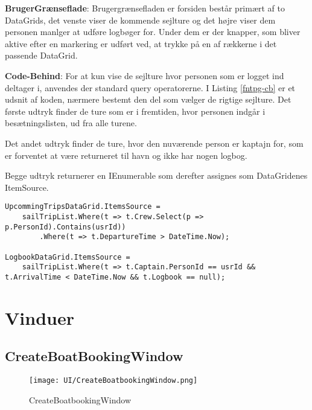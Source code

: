 \textbf{BrugerGrænseflade}: 
Brugergrænsefladen er forsiden består primært af to DataGrids, det venste viser de kommende sejlture og det højre viser dem personen manlger at udføre logbøger for. 
Under dem er der knapper, som bliver aktive efter en markering er udført ved, at trykke på en af rækkerne i det passende DataGrid.

\textbf{Code-Behind}: 
For at kun vise de sejlture hvor personen som er logget ind deltager i, anvendes der standard query operatorerne. 
I Listing \ref{fntpg-cb} er et udsnit af koden, nærmere bestemt den del som vælger de rigtige sejlture.
Det første udtryk finder de ture som er i fremtiden, hvor personen indgår i besætningslisten, ud fra alle turene.

Det andet udtryk finder de ture, hvor den nuværende person er kaptajn for, som er forventet at være returneret til havn og ikke har nogen logbog. 

Begge udtryk returnerer en IEnumerable som derefter assignes som DataGridenes ItemSource.

\begin{lstlisting}[frame=single, caption=Forsidens Code-Behind, label=fntpg-cb]
UpcommingTripsDataGrid.ItemsSource =
    sailTripList.Where(t => t.Crew.Select(p => p.PersonId).Contains(usrId))
        .Where(t => t.DepartureTime > DateTime.Now);

LogbookDataGrid.ItemsSource =
    sailTripList.Where(t => t.Captain.PersonId == usrId && t.ArrivalTime < DateTime.Now && t.Logbook == null);
\end{lstlisting}

\section{Vinduer}
\subsection{CreateBoatBookingWindow}

\begin{wrapfigure}{R}{0.5\textwidth}
    \label{img:boatBookWindow}
    \vspace{-20pt}
    \begin{center}
        \texttt{[image: UI/CreateBoatbookingWindow.png]}
    \end{center}
    \vspace{-20pt}
    \caption{CreateBoatbookingWindow}
    \vspace{-30pt}
\end{wrapfigure}


